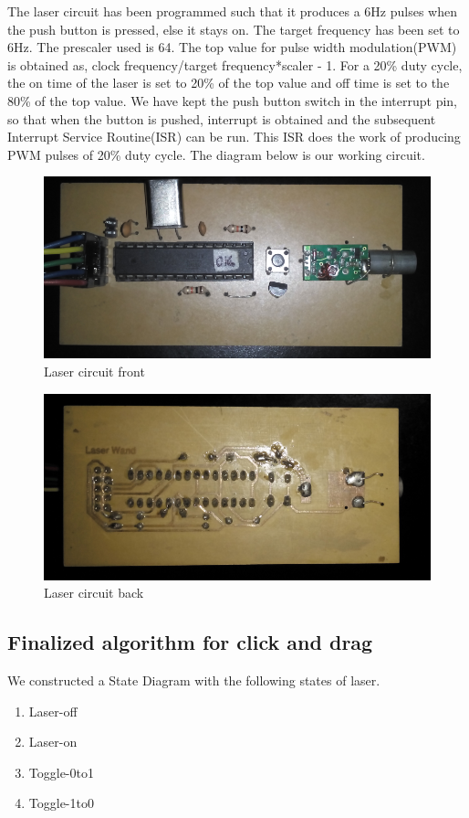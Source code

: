 \documentclass[12pt, a4paper]{article}
\begin{document}
	The laser circuit has been programmed such that it produces a 6Hz pulses when the push button is pressed, else it stays on. The target frequency has been set to 6Hz. The prescaler used is 64. The top value for pulse width modulation(PWM) is obtained as, clock frequency/target frequency*scaler - 1. For a 20\% duty cycle, the on time of the laser is set to 20\% of the top value and off time is set to the 80\% of the top value. We have kept the push button switch in the interrupt pin, so that when the button is pushed, interrupt is obtained and the subsequent Interrupt Service Routine(ISR) can be run. This ISR does the work of producing PWM pulses of 20\% duty cycle. The diagram below is our working circuit.

\begin{figure}[htp]
	\centering
	\includegraphics[scale=0.15]{front.png}
	\caption{Laser circuit front}
	\label{}
\end{figure}

\begin{figure}[htp]
	\centering
	\includegraphics[scale=0.15]{back.png}
	\caption{Laser circuit back}
	\label{}
\end{figure}


\subsection{Finalized algorithm for click and drag}
	We constructed a State Diagram with the following states of laser.
\begin{enumerate}
\item Laser-off
\item Laser-on
\item Toggle-0to1
\item Toggle-1to0
\end{enumerate}
\end{document}
